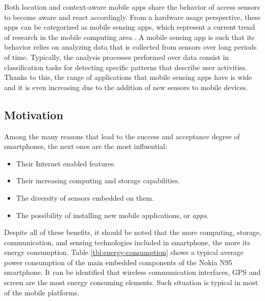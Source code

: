 Both location and context-aware mobile apps share the behavior of access sensors to become aware and react accordingly.
From a hardware usage perspective, these apps can be categorized as mobile sensing apps, which represent a current trend of research in the mobile computing area \cite{Lane2010, Campbell2012}.
A mobile sensing app is such that its behavior relies on analyzing data that is collected from sensors over long periods of time.
Typically, the analysis processes performed over data consist in classification tasks for detecting specific patterns that describe user activities.
Thanks to this, the range of applications that mobile sensing apps have is wide and it is even increasing due to the addition of new sensors to mobile devices.

\subsection{Motivation}
\label{sub:motivation}
Among the many reasons that lead to the success and acceptance degree of smartphones, the next ones are the most influential:
\begin{itemize}
	\item Their Internet enabled features.
	\item Their increasing computing and storage capabilities.
	\item The diversity of sensors embedded on them.
	\item The possibility of installing new mobile applications, or \emph{apps}.
\end{itemize}

Despite all of these benefits, it should be noted that the more computing, storage, communication, and sensing technologies included in smartphone, the more its energy consumption.
Table \ref{tbl:energy-consumption} shows a typical average power consumption of the main embedded components of the Nokia N95 smartphone.
It can be identified that wireless communication interfaces, GPS and screen are the most energy consuming elements.
Such situation is typical in most of the mobile platforms.

